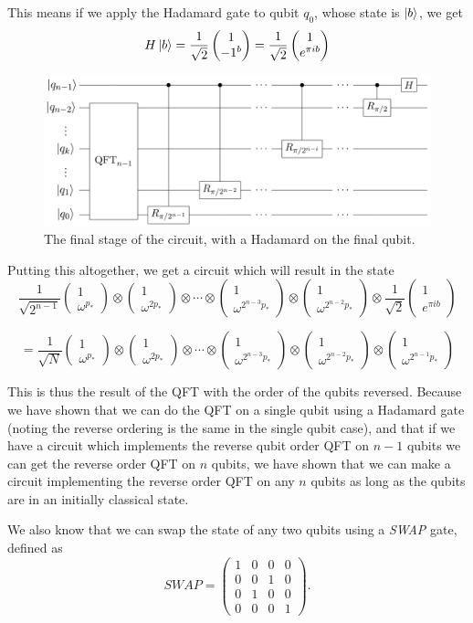 \documentclass[11pt]{report}
\newcommand{\?}{\stackrel{?}{=}}
\newcommand{\qcol}[2]{\ensuremath{\begin{pmatrix} #1 \\ #2 \end{pmatrix}}}
\begin{document}
This means if we apply the Hadamard gate to qubit $q_0$, whose state is $\Ket{b}$, we get
$$H\Ket{b} = \frac{1}{\sqrt{2}} \qcol{1}{-1^b} = \frac{1}{\sqrt{2}} \qcol{1}{e^{\pi i b}}$$

\begin{figure}[h]
\centering
\includegraphics[width=1\textwidth]{resources/images/qft3.png}
\caption{\label{fig:qft3}The final stage of the circuit, with a Hadamard on the final qubit.}
\end{figure}

Putting this altogether, we get a circuit which will result in the state
$$\frac{1}{\sqrt{2^{n-1}}} 
  \qcol{1}{\omega^{p_*}}
  \otimes
  \qcol{1}{\omega^{2p_*}}
  \otimes \cdots \otimes
  \qcol{1}{\omega^{2^{n-3}p_*}}
  \otimes
  \qcol{1}{\omega^{2^{n-2}p_*}}
  \otimes
  \frac{1}{\sqrt{2}} \qcol{1}{e^{\pi i b}}$$
  
$$= \frac{1}{\sqrt{N}}
  \qcol{1}{\omega^{p_*}}
  \otimes
  \qcol{1}{\omega^{2p_*}}
  \otimes \cdots \otimes
  \qcol{1}{\omega^{2^{n-3}p_*}}
  \otimes
  \qcol{1}{\omega^{2^{n-2}p_*}}
  \otimes
  \qcol{1}{\omega^{2^{n-1}p_*}}$$

This is thus the result of the QFT with the order of the qubits reversed. Because we have shown that we can do the QFT on a single qubit using a Hadamard gate (noting the reverse ordering is the same in the single qubit case), and that if we have a circuit which implements the reverse qubit order QFT on $n-1$ qubits we can get the reverse order QFT on $n$ qubits, we have shown that we can make a circuit implementing the reverse order QFT on any $n$ qubits as long as the qubits are in an initially classical state.

We also know that we can swap the state of any two qubits using a \textit{SWAP} gate, defined as
$$\textit{SWAP} = \begin{pmatrix}
1 & 0 & 0 & 0\\
0 & 0 & 1 & 0\\
0 & 1 & 0 & 0\\
0 & 0 & 0 & 1
\end{pmatrix}.$$
\end{document}
